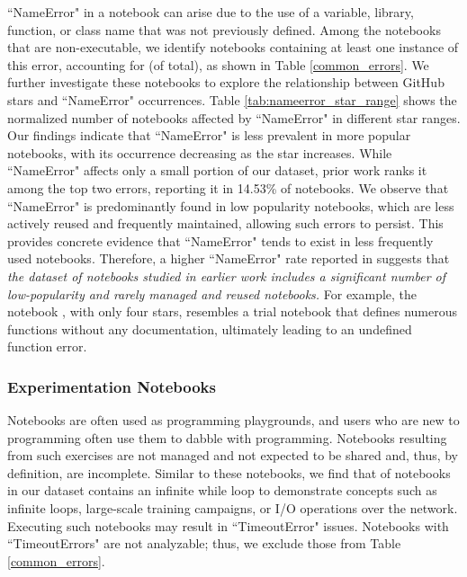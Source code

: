         ``NameError" in a notebook can arise due to the use of a variable, library, function, or class name that was not previously defined. Among the \totalNonExecutable notebooks that are non-executable, we identify \totalNameError notebooks containing at least one instance of this error, accounting for \percentNameErrorInNonExecutable (\percentNameErrorInTotal of total), as shown in Table \ref{common_errors}. We further investigate these notebooks to explore the relationship between GitHub stars and ``NameError" occurrences. Table \ref{tab:nameerror_star_range} shows the normalized number of notebooks affected by ``NameError" in different star ranges. Our findings indicate that ``NameError" is less prevalent in more popular notebooks, with its occurrence decreasing as the star increases. While ``NameError" affects only a small portion of our dataset, prior work \cite{Pimentel2019} ranks it among the top two errors, reporting it in 14.53\% of notebooks. We observe that ``NameError" is predominantly found in low popularity notebooks, which are less actively reused and frequently maintained, allowing such errors to persist. This provides concrete evidence that ``NameError" tends to exist in less frequently used notebooks. Therefore, a higher ``NameError" rate reported in \cite{Pimentel2019} suggests that {\em the dataset of notebooks studied in earlier work includes a significant number of low-popularity and rarely managed and reused notebooks.} For example, the notebook \cite{JadFatTail}, with only four stars, resembles a trial notebook that defines numerous functions without any documentation, ultimately leading to an undefined function error.
        
          
    
    \subsubsection{Experimentation Notebooks}
        Notebooks are often used as programming playgrounds, and users who are new to programming often use them to dabble with programming. Notebooks resulting from such exercises are not managed and not expected to be shared and, thus, by definition, are incomplete. Similar to these notebooks, we find that \percentTimeout of notebooks in our dataset contains an infinite while loop to demonstrate concepts such as infinite loops, large-scale training campaigns, or I/O operations over the network. Executing such notebooks may result in ``TimeoutError" issues. Notebooks with ``TimeoutErrors" are not analyzable; thus, we exclude those from Table \ref{common_errors}. %


